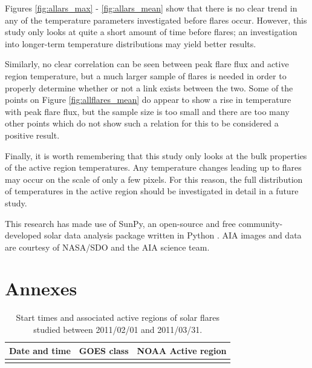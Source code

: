 \documentclass[referee,a4paper,12pt]{swsc}
\begin{document}
\begin{linenumbers}
Figures \ref{fig:allars_max} - \ref{fig:allars_mean} show that there is no clear trend in any of the temperature parameters investigated before flares occur.
However, this study only looks at quite a short amount of time before flares; an investigation into longer-term temperature distributions may yield better results.

Similarly, no clear correlation can be seen between peak flare flux and active region temperature, but a much larger sample of flares is needed in order to properly determine whether or not a link exists between the two.
Some of the points on Figure \ref{fig:allflares_mean} do appear to show a rise in temperature with peak flare flux, but the sample size is too small and there are too many other points which do not show such a relation for this to be considered a positive result.

Finally, it is worth remembering that this study only looks at the bulk properties of the active region temperatures.
Any temperature changes leading up to flares may occur on the scale of only a few pixels.
For this reason, the full distribution of temperatures in the active region should be investigated in detail in a future study.

\begin{acknowledgements}
	This research has made use of SunPy, an open-source and free community-developed solar data analysis package written in Python \citep{Mumford2013}.
	AIA images and data are courtesy of NASA/SDO and the AIA science team.
\end{acknowledgements}

\section*{Annexes}
\begin{longtable}{c|c|c}
	\caption{Start times and associated active regions of solar flares studied between 2011/02/01 and 2011/03/31.}\\
		Date and time & GOES class & NOAA Active region \\
		\hline
		
	\label{tab:flares}
\end{longtable}



\end{linenumbers}
\end{document}
